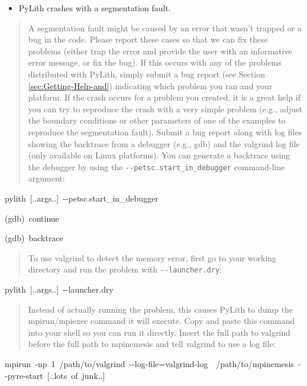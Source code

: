 \begin{itemize}
\item PyLith crashes with a segmentation fault.\end{itemize}
\begin{quote}
A segmentation fault might be caused by an error that wasn't trapped
or a bug in the code. Please report these cases so that we can fix
these problems (either trap the error and provide the user with an
informative error message, or fix the bug). If this occurs with any
of the problems distributed with PyLith, simply submit a bug report
(see Section \ref{sec:Getting-Help-and}) indicating which problem
you ran and your platform. If the crash occurs for a problem you created,
it is a great help if you can try to reproduce the crash with a very
simple problem (e.g., adjust the boundary conditions or other parameters
of one of the examples to reproduce the segmentation fault). Submit
a bug report along with log files showing the backtrace from a debugger
(e.g., gdb) and the valgrind log file (only available on Linux platforms).
You can generate a backtrace using the debugger by using the \texttt{-{}-petsc.start\_in\_debugger}
command-line argument:\end{quote}
\begin{lyxcode}
pylith~{[}..args..{]}~-{}-petsc.start\_in\_debugger

(gdb)~continue

(gdb)~backtrace\end{lyxcode}
\begin{quote}
To use valgrind to detect the memory error, first go to your working
directory and run the problem with \texttt{-{}-launcher.dry}:\end{quote}
\begin{lyxcode}
pylith~{[}..args..{]}~-{}-launcher.dry\end{lyxcode}
\begin{quote}
Instead of actually running the problem, this causes PyLith to dump
the mpirun/mpiexec command it will execute. Copy and paste this command
into your shell so you can run it directly. Insert the full path to
valgrind before the full path to mpinemesis and tell valgrind to use
a log file:\end{quote}
\begin{lyxcode}
{\footnotesize{}mpirun~-np~1~/path/to/valgrind~-{}-log-file=valgrind-log~~/path/to/mpinemesis~-{}-pyre-start~{[}..lots~of~junk..{]}}{\footnotesize \par}
\end{lyxcode}

